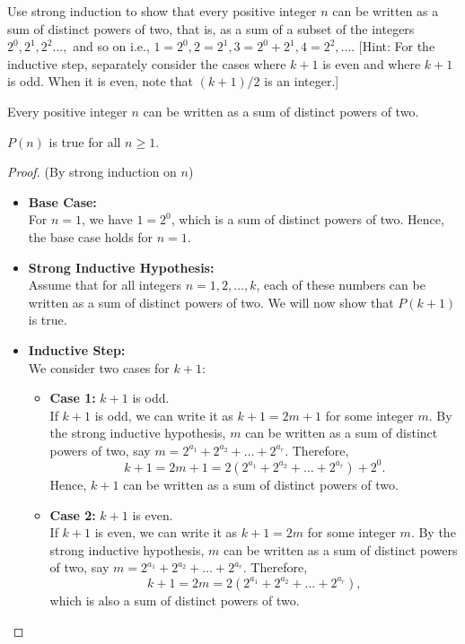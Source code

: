 \documentclass[12pt]{article}
\newcommand{\vs}{\vspace{2mm}}
\newcommand{\ls}{\vspace{5mm}}
\begin{document}

Use strong induction to show that every positive integer $n$ can be written as a sum of distinct powers of two, that is, as a sum of a subset of the integers $2^0 , 2^1 , 2^2 …,$ and so on  i.e., $1=2^0 , 2=  2^1 , 3=2^0+ 2^1, 4=2^2 , ... $. [Hint: For the inductive step, separately consider the cases where $k + 1$ is even and where $k+1$ is odd. When it is even, note that $(k + 1)/2$ is an integer.]
\vs\


  Every positive integer $n$ can be written as a sum of distinct powers of two.
\ls\

 $P(n)$ is true for all $n \geq 1$.
\vs\

\begin{proof} (By strong induction on $n$)

    \begin{itemize}
    
    \item \textbf{Base Case:} \\
    For $n = 1$, we have $1 = 2^0$, which is a sum of distinct powers of two. Hence, the base case holds for $n = 1$.
    
    \item \textbf{Strong Inductive Hypothesis:} \\
    Assume that for all integers $n = 1, 2, \ldots, k$, each of these numbers can be written as a sum of distinct powers of two. We will now show that $P(k+1)$ is true.

    \item \textbf{Inductive Step:} \\
    We consider two cases for $k+1$:
    
    \begin{itemize}
    
    \item \textbf{Case 1:} $k + 1$ is odd. \\
    If $k + 1$ is odd, we can write it as $k + 1 = 2m + 1$ for some integer $m$. By the strong inductive hypothesis, $m$ can be written as a sum of distinct powers of two, say $m = 2^{a_1} + 2^{a_2} + \dots + 2^{a_r}$. Therefore,
    \[
    k + 1 = 2m + 1 = 2(2^{a_1} + 2^{a_2} + \dots + 2^{a_r}) + 2^0.
    \]
    Hence, $k + 1$ can be written as a sum of distinct powers of two.
    
    \item \textbf{Case 2:} $k + 1$ is even. \\
    If $k + 1$ is even, we can write it as $k + 1 = 2m$ for some integer $m$. By the strong inductive hypothesis, $m$ can be written as a sum of distinct powers of two, say $m = 2^{a_1} + 2^{a_2} + \dots + 2^{a_r}$. Therefore,
    \[
    k + 1 = 2m = 2(2^{a_1} + 2^{a_2} + \dots + 2^{a_r}),
    \]
    which is also a sum of distinct powers of two.
    

\end{itemize}
\end{itemize}
\end{proof}
\end{document}
